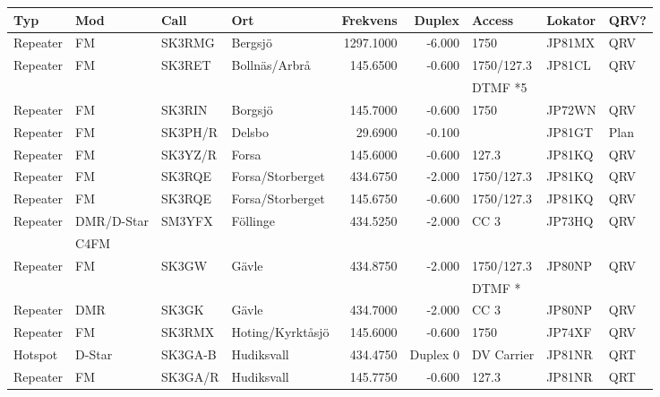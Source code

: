 \begin{landscape}
\begin{longtable}{llllrrlll}
\bf Typ  & \bf Mod     & \bf Call & \bf Ort     & \bf Frekvens & \bf Duplex & \bf Access & \bf Lokator & \bf QRV? \\ \hline \endhead
Repeater   & FM         & SK3RMG   & Bergsjö          & 1297.1000   & -6.000   & 1750       & JP81MX & QRV  \\
Repeater   & FM         & SK3RET   & Bollnäs/Arbrå    & 145.6500    & -0.600   & 1750/127.3 & JP81CL & QRV  \\
           &            &          &                  &             &          & DTMF *5    &        &      \\
Repeater   & FM         & SK3RIN   & Borgsjö          & 145.7000    & -0.600   & 1750       & JP72WN & QRV  \\
Repeater   & FM         & SK3PH/R  & Delsbo           & 29.6900     & -0.100   &            & JP81GT & Plan \\
Repeater   & FM         & SK3YZ/R  & Forsa            & 145.6000    & -0.600   & 127.3      & JP81KQ & QRV  \\
Repeater   & FM         & SK3RQE   & Forsa/Storberget & 434.6750    & -2.000   & 1750/127.3 & JP81KQ & QRV  \\
Repeater   & FM         & SK3RQE   & Forsa/Storberget & 145.6750    & -0.600   & 1750/127.3 & JP81KQ & QRV  \\
Repeater   & DMR/D-Star & SM3YFX   & Föllinge         & 434.5250    & -2.000   & CC 3       & JP73HQ & QRV  \\
           & C4FM       &          &                  &             &          &            &        &      \\
Repeater   & FM         & SK3GW    & Gävle            & 434.8750    & -2.000   & 1750/127.3 & JP80NP & QRV  \\
           &            &          &                  &             &          & DTMF *     &        &      \\
Repeater   & DMR        & SK3GK    & Gävle            & 434.7000    & -2.000   & CC 3       & JP80NP & QRV  \\
Repeater   & FM         & SK3RMX   & Hoting/Kyrktåsjö & 145.6000    & -0.600   & 1750       & JP74XF & QRV  \\
Hotspot    & D-Star     & SK3GA-B  & Hudiksvall       & 434.4750    & Duplex 0 & DV Carrier & JP81NR & QRT  \\
Repeater   & FM         & SK3GA/R  & Hudiksvall       & 145.7750    & -0.600   & 127.3      & JP81NR & QRT  \\

\end{longtable}
\end{landscape}
